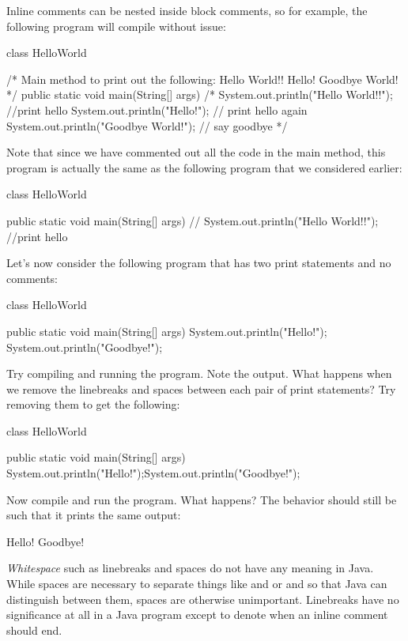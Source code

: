 Inline comments can be nested inside block comments, so for example, the following program
will compile without issue:
\begin{code}
class HelloWorld {

    /* Main method to print out the following:
         Hello World!!
         Hello!
         Goodbye World!
    */
    public static void main(String[] args) {
        /*
        System.out.println("Hello World!!"); //print hello
        System.out.println("Hello!"); // print hello again
        System.out.println("Goodbye World!"); // say goodbye
        */
    }

}
\end{code}
Note that since we have commented out all the code in the main method,
this program is actually the same as the following program that we considered earlier:
\begin{code}
class HelloWorld {

    public static void main(String[] args) {
//        System.out.println("Hello World!!"); //print hello
    }

}
\end{code}

Let's now consider the following program that has two print statements and no comments:
\begin{code}
class HelloWorld {

    public static void main(String[] args) {
        System.out.println("Hello!");
        System.out.println("Goodbye!");
    }

}
\end{code}
Try compiling and running the program. Note the output.
What happens when we remove the linebreaks and spaces between each pair of print statements?
Try removing them to get the following:
\begin{code}
class HelloWorld {

    public static void main(String[] args) {
        System.out.println("Hello!");System.out.println("Goodbye!");
    }

}
\end{code}
Now compile and run the program. What happens?
The behavior should still be such that it prints the same output:
\begin{code}
Hello!
Goodbye!
\end{code}
\emph{Whitespace} such as linebreaks and spaces do not have any meaning in Java.
While spaces are necessary to separate things like  and  or  and 
so that Java can distinguish between them, spaces are otherwise unimportant.
Linebreaks have no significance at all in a Java program except to denote when an inline comment
should end.

